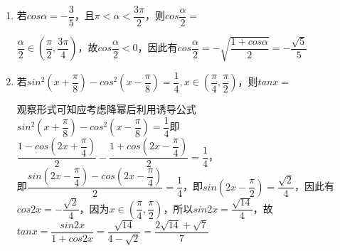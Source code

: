 \begin{enumerate}
    \item 若$cos\alpha = -\dfrac{3}{5}$，且$\pi < \alpha < \dfrac{3\pi}{2}$，则$cos\dfrac{\alpha}{2} = $
    \begin{jieda}
        $\dfrac{\alpha}{2} \in \left(\dfrac{\pi}{2}, \dfrac{3\pi}{4} \right)$，故$cos\dfrac{\alpha}{2}<0$，因此有$cos\dfrac{\alpha}{2} = -\sqrt{\dfrac{1+cos\alpha}{2}} = -\dfrac{\sqrt{5}}{5}$
    \end{jieda}

    \item 若$sin^2\left(x+\dfrac{\pi}{8}\right) - cos^2\left(x-\dfrac{\pi}{8}\right) = \dfrac{1}{4}, x \in \left(\dfrac{\pi}{4}, \dfrac{\pi}{2}\right)$，则$tanx = $
    \begin{jieda}
        观察形式可知应考虑降幂后利用诱导公式\\
        $sin^2(x+\dfrac{\pi}{8}) - cos^2(x-\dfrac{\pi}{8}) = \dfrac{1}{4}$即$\dfrac{1-cos\left(2x+\dfrac{\pi}{4}\right)}{2} - \dfrac{1+cos\left(2x-\dfrac{\pi}{4}\right)}{2} = \dfrac{1}{4}$，\\
        即$\dfrac{sin(2x-\dfrac{\pi}{4}) - cos\left(2x-\dfrac{\pi}{4}\right)}{2} = \dfrac{1}{4}$，即$sin\left(2x-\dfrac{\pi}{2}\right) = \dfrac{\sqrt{2}}{4}$，因此有$cos2x = -\dfrac{\sqrt{2}}{4}$，因为$x \in \left(\dfrac{\pi}{4}, \dfrac{\pi}{2}\right)$，所以$sin2x = \dfrac{\sqrt{14}}{4}$，故$tanx = \dfrac{sin2x}{1+cos2x} = \dfrac{\sqrt{14}}{4-\sqrt{2}} = \dfrac{2\sqrt{14} + \sqrt{7}}{7}$
    \end{jieda}
\end{enumerate}